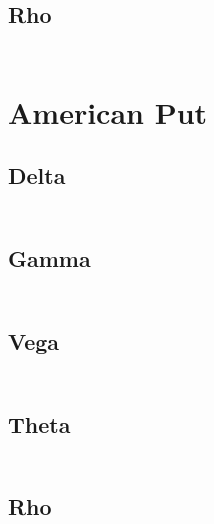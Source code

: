 \documentclass[12pt,a4paper]{article}
\begin{document}
\subsection{Rho}
\[
\begin{aligned}  
\end{aligned}
\]

\section{American Put}
\subsection{Delta}
\[
\begin{aligned}  
\end{aligned}
\]
\subsection{Gamma}
\[
\begin{aligned}  
\end{aligned}
\]
\subsection{Vega}
\[
\begin{aligned}  
\end{aligned}
\]
\subsection{Theta}
\[
\begin{aligned}  
\end{aligned}
\]
\subsection{Rho}
\[
\begin{aligned}  
\end{aligned}
\]
\end{document}
